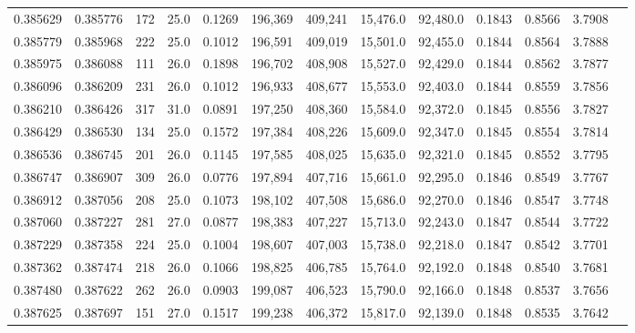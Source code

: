 \begin{tabular}{rrrrrrrrrrrrr}
0.385629 & 0.385776 &   172 & 25.0 &                                     0.1269 & 196,369 & 409,241 &  15,476.0 &  92,480.0 & 0.1843 & 0.8566 & 3.7908 \\
0.385779 & 0.385968 &   222 & 25.0 &                                     0.1012 & 196,591 & 409,019 &  15,501.0 &  92,455.0 & 0.1844 & 0.8564 & 3.7888 \\
0.385975 & 0.386088 &   111 & 26.0 &                                     0.1898 & 196,702 & 408,908 &  15,527.0 &  92,429.0 & 0.1844 & 0.8562 & 3.7877 \\
0.386096 & 0.386209 &   231 & 26.0 &                                     0.1012 & 196,933 & 408,677 &  15,553.0 &  92,403.0 & 0.1844 & 0.8559 & 3.7856 \\
0.386210 & 0.386426 &   317 & 31.0 &                                     0.0891 & 197,250 & 408,360 &  15,584.0 &  92,372.0 & 0.1845 & 0.8556 & 3.7827 \\
0.386429 & 0.386530 &   134 & 25.0 &                                     0.1572 & 197,384 & 408,226 &  15,609.0 &  92,347.0 & 0.1845 & 0.8554 & 3.7814 \\
0.386536 & 0.386745 &   201 & 26.0 &                                     0.1145 & 197,585 & 408,025 &  15,635.0 &  92,321.0 & 0.1845 & 0.8552 & 3.7795 \\
0.386747 & 0.386907 &   309 & 26.0 &                                     0.0776 & 197,894 & 407,716 &  15,661.0 &  92,295.0 & 0.1846 & 0.8549 & 3.7767 \\
0.386912 & 0.387056 &   208 & 25.0 &                                     0.1073 & 198,102 & 407,508 &  15,686.0 &  92,270.0 & 0.1846 & 0.8547 & 3.7748 \\
0.387060 & 0.387227 &   281 & 27.0 &                                     0.0877 & 198,383 & 407,227 &  15,713.0 &  92,243.0 & 0.1847 & 0.8544 & 3.7722 \\
0.387229 & 0.387358 &   224 & 25.0 &                                     0.1004 & 198,607 & 407,003 &  15,738.0 &  92,218.0 & 0.1847 & 0.8542 & 3.7701 \\
0.387362 & 0.387474 &   218 & 26.0 &                                     0.1066 & 198,825 & 406,785 &  15,764.0 &  92,192.0 & 0.1848 & 0.8540 & 3.7681 \\
0.387480 & 0.387622 &   262 & 26.0 &                                     0.0903 & 199,087 & 406,523 &  15,790.0 &  92,166.0 & 0.1848 & 0.8537 & 3.7656 \\
0.387625 & 0.387697 &   151 & 27.0 &                                     0.1517 & 199,238 & 406,372 &  15,817.0 &  92,139.0 & 0.1848 & 0.8535 & 3.7642 \\

\end{tabular}
